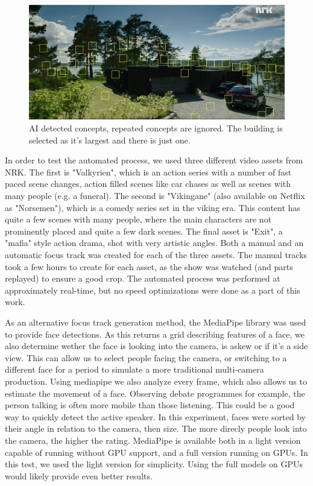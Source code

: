 \documentclass[sigconf, review=false]{acmart}
\begin{document}
\begin{figure}
\begin{center}
\includegraphics[width=1.0\columnwidth]{track_stuff.png}
\caption{AI detected concepts, repeated concepts are ignored. The building is
 selected as it's largest and there is just one.}
\label{fig_stuff_tracking}
\end{center}
\end{figure}

In order to test the automated process, we used three different video assets
from NRK. The first is "Valkyrien", which is an action series with a number
of fast paced scene changes, action filled scenes like car chases as well as
scenes with many people (e.g. a funeral). The second is "Vikingane"
(also available on Netflix as "Norsemen"), which is a comedy series set in
the viking era. This content has quite a few scenes with many people, where
the main characters are not prominently placed and quite a few dark scenes.
The final asset is "Exit", a "mafia" style action drama, shot with very
artistic angles. Both a manual and an automatic focus track was created for
each of the three assets. The manual tracks took a few hours to create for
each asset, as the show was watched (and parts replayed) to ensure a good
crop. The automated process was performed at approximately real-time, but no
speed optimizations were done as a part of this work.

As an alternative focus track generation method, the MediaPipe library\cite
{mediapipe} was used to provide face detections. As this returns a grid
describing features of a face, we also determine wether the face is looking
into the camera, is askew or if it's a side view. This can allow us to select
people facing the camera, or switching to a different face for a period to
simulate a more traditional multi-camera production. Using mediapipe we also
analyze every frame, which also allows us to estimate the movement of a face.
Observing debate programmes for example, the person talking is often more
mobile than those listening. This could be a good way to quickly detect the
active speaker. In this experiment, faces were sorted by their angle in
relation to the camera, then size. The more direcly people look into the
camera, the higher the rating. MediaPipe is available both in a light version
capable of running without GPU support, and a full version running on GPUs.
In this test, we used the light version for simplicity. Using the full models
on GPUs would likely provide even better results.
\end{document}
